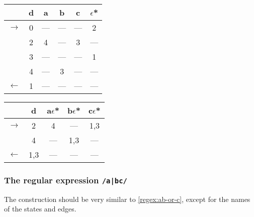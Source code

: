\documentclass[toc=flat]{scrartcl}
\begin{document}
  \begin{center}
    \begin{tabular}{cc|cccc}
       \toprule
                     & d &   a &   b & c   & $\epsilon$* \\
       \midrule
       $\rightarrow$ & 0 & --- & --- & --- &   2 \\
                     & 2 &   4 & --- &   3 & --- \\
                     & 3 & --- & --- & --- &   1 \\
                     & 4 & --- &   3 & --- & --- \\
       $\leftarrow$  & 1 & --- & --- & --- & --- \\
       \bottomrule
    \end{tabular}
  \end{center}
  
  \begin{center}
    \begin{tabular}{cc|ccc}
      \toprule
                    & d & a$\epsilon$*  & b$\epsilon$* & c$\epsilon$* \\
      \midrule
      $\rightarrow$ &  2  &  4  & --- & 1,3 \\
                    &  4  & --- & 1,3 & --- \\
      $\leftarrow$  & 1,3 & --- & --- & --- \\
    \end{tabular}
  \end{center}
  
  \begin{center}
  \end{center}
  
  \subsubsection{The regular expression \texttt{/a|bc/}}
  
  The construction should be very similar to \vref{regex:ab-or-c}, except for the names of the states and edges.
  
\end{document}
